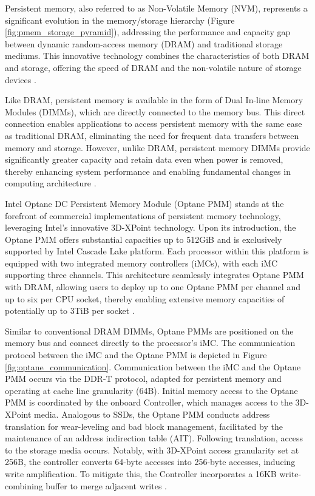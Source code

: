 Persistent memory, also referred to as Non-Volatile Memory (NVM), represents a significant evolution in the memory/storage hierarchy (Figure \ref{fig:pmem_storage_pyramid}), addressing the performance and capacity gap between dynamic random-access memory (DRAM) and traditional storage mediums. This innovative technology combines the characteristics of both DRAM and storage, offering the speed of DRAM and the non-volatile nature of storage devices \cite{scargall2020pmem}.

Like DRAM, persistent memory is available in the form of Dual In-line Memory Modules (DIMMs), which are directly connected to the memory bus. This direct connection enables applications to access persistent memory with the same ease as traditional DRAM, eliminating the need for frequent data transfers between memory and storage. However, unlike DRAM, persistent memory DIMMs provide significantly greater capacity and retain data even when power is removed, thereby enhancing system performance and enabling fundamental changes in computing architecture \cite{rudoff2017persistent,scargall2020pmem}.

Intel Optane DC Persistent Memory Module (Optane PMM) stands at the forefront of commercial implementations of persistent memory technology, leveraging Intel's innovative 3D-XPoint technology. Upon its introduction, the Optane PMM offers substantial capacities up to 512GiB and is exclusively supported by Intel Cascade Lake platform. Each processor within this platform is equipped with two integrated memory controllers (iMCs), with each iMC supporting three channels. This architecture seamlessly integrates Optane PMM with DRAM, allowing users to deploy up to one Optane PMM per channel and up to six per CPU socket, thereby enabling extensive memory capacities of potentially up to 3TiB per socket \cite{yang2020empirical,izraelevitz2019basic}.

Similar to conventional DRAM DIMMs, Optane PMMs are positioned on the memory bus and connect directly to the processor's iMC. The communication protocol between the iMC and the Optane PMM is depicted in Figure \ref{fig:optane_communication}.  Communication between the iMC and the Optane PMM occurs via the DDR-T protocol, adapted for persistent memory and operating at cache line granularity (64B). Initial memory access to the Optane PMM is coordinated by the onboard Controller, which manages access to the 3D-XPoint media. Analogous to SSDs, the Optane PMM conducts address translation for wear-leveling and bad block management, facilitated by the maintenance of an address indirection table (AIT). Following translation, access to the storage media occurs. Notably, with 3D-XPoint access granularity set at 256B, the controller converts 64-byte accesses into 256-byte accesses, inducing write amplification. To mitigate this, the Controller incorporates a 16KB write-combining buffer to merge adjacent writes \cite{yang2020empirical,izraelevitz2019basic,wu2020ribbon}.

